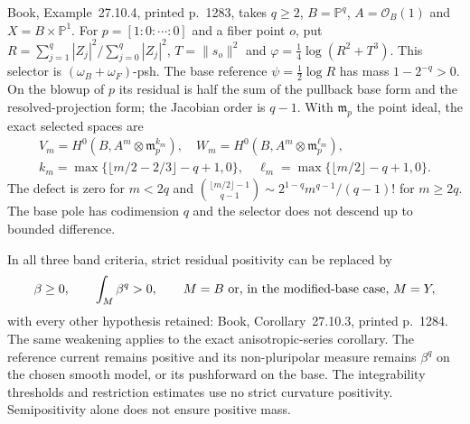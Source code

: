 \documentclass[11pt]{article}
\begin{document}
Book, Example~27.10.4, printed p.~1283, takes $q\geq2$, $B=\mathbb P^q$, $A=\mathcal O_B(1)$ and $X=B\times\mathbb P^1$. For $p=[1:0:\cdots:0]$ and a fiber point $o$, put $R=\sum_{j=1}^q|Z_j|^2/\sum_{j=0}^q|Z_j|^2$, $T=\|s_o\|^2$ and $\varphi=\tfrac14\log(R^2+T^3)$. This selector is $(\omega_B+\omega_F)$-psh. The base reference $\psi=\tfrac12\log R$ has mass $1-2^{-q}>0$. On the blowup of $p$ its residual is half the sum of the pullback base form and the resolved-projection form; the Jacobian order is $q-1$. With $\mathfrak m_p$ the point ideal, the exact selected spaces are
\[
 \begin{gathered}
 V_m=H^0(B,A^m\otimes\mathfrak m_p^{k_m}),\quad
 W_m=H^0(B,A^m\otimes\mathfrak m_p^{\ell_m}),\\
 k_m=\max\{\lfloor m/2-2/3\rfloor-q+1,0\},\quad
 \ell_m=\max\{\lfloor m/2\rfloor-q+1,0\}.
 \end{gathered}
\]
The defect is zero for $m<2q$ and $\binom{\lfloor m/2\rfloor-1}{q-1}\sim2^{1-q}m^{q-1}/(q-1)!$ for $m\geq2q$. The base pole has codimension $q$ and the selector does not descend up to bounded difference.

In all three band criteria, strict residual positivity can be replaced by
\[
 \beta\geq0,\qquad \int_M\beta^q>0,
 \qquad M=B\ \hbox{or, in the modified-base case, }M=Y,
\]
with every other hypothesis retained: Book, Corollary~27.10.3, printed p.~1284. The same weakening applies to the exact anisotropic-series corollary. The reference current remains positive and its non-pluripolar measure remains $\beta^q$ on the chosen smooth model, or its pushforward on the base. The integrability thresholds and restriction estimates use no strict curvature positivity. Semipositivity alone does not ensure positive mass.
\end{document}
